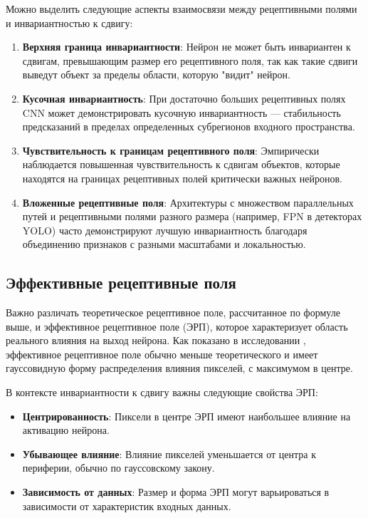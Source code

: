 Можно выделить следующие аспекты взаимосвязи между рецептивными полями и инвариантностью к сдвигу:

\begin{enumerate}
    \item \textbf{Верхняя граница инвариантности}: Нейрон не может быть инвариантен к сдвигам, превышающим размер его рецептивного поля, так как такие сдвиги выведут объект за пределы области, которую "видит" нейрон.
    
    \item \textbf{Кусочная инвариантность}: При достаточно больших рецептивных полях CNN может демонстрировать кусочную инвариантность — стабильность предсказаний в пределах определенных субрегионов входного пространства.
    
    \item \textbf{Чувствительность к границам рецептивного поля}: Эмпирически наблюдается повышенная чувствительность к сдвигам объектов, которые находятся на границах рецептивных полей критически важных нейронов.
    
    \item \textbf{Вложенные рецептивные поля}: Архитектуры с множеством параллельных путей и рецептивными полями разного размера (например, FPN в детекторах YOLO) часто демонстрируют лучшую инвариантность благодаря объединению признаков с разными масштабами и локальностью.
\end{enumerate}

\subsection{Эффективные рецептивные поля}
\label{theory:receptive_fields:effective}

Важно различать теоретическое рецептивное поле, рассчитанное по формуле выше, и эффективное рецептивное поле (ЭРП), которое характеризует область реального влияния на выход нейрона. Как показано в исследовании \cite{Luo2016}, эффективное рецептивное поле обычно меньше теоретического и имеет гауссовидную форму распределения влияния пикселей, с максимумом в центре.

В контексте инвариантности к сдвигу важны следующие свойства ЭРП:

\begin{itemize}
    \item \textbf{Центрированность}: Пиксели в центре ЭРП имеют наибольшее влияние на активацию нейрона.
    
    \item \textbf{Убывающее влияние}: Влияние пикселей уменьшается от центра к периферии, обычно по гауссовскому закону.
    
    \item \textbf{Зависимость от данных}: Размер и форма ЭРП могут варьироваться в зависимости от характеристик входных данных.
\end{itemize}

